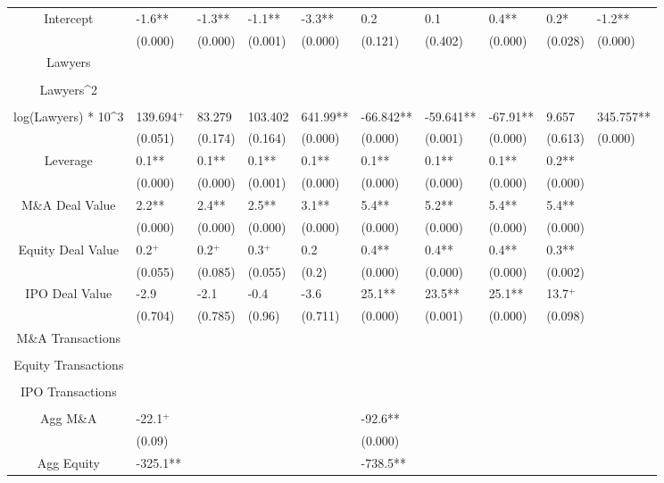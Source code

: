 \documentclass{article}
\begin{document}
\begin{table}[H]
\begin{tabular}{|clllllllll|}
Intercept & -1.6** & -1.3** & -1.1** & -3.3** & 0.2 & 0.1 & 0.4** & 0.2* & -1.2** \\
   & (0.000) & (0.000) & (0.001) & (0.000) & (0.121) & (0.402) & (0.000) & (0.028) & (0.000) \\
  Lawyers &  &  &  &  &  &  &  &  &  \\
   &  &  &  &  &  &  &  &  &  \\
  Lawyers^2 &  &  &  &  &  &  &  &  &  \\
   &  &  &  &  &  &  &  &  &  \\
  log(Lawyers) * 10^3 & 139.694$^{+}$ & 83.279 & 103.402 & 641.99** & -66.842** & -59.641** & -67.91** & 9.657 & 345.757** \\
   & (0.051) & (0.174) & (0.164) & (0.000) & (0.000) & (0.001) & (0.000) & (0.613) & (0.000) \\
  Leverage & 0.1** & 0.1** & 0.1** & 0.1** & 0.1** & 0.1** & 0.1** & 0.2** &  \\
   & (0.000) & (0.000) & (0.001) & (0.000) & (0.000) & (0.000) & (0.000) & (0.000) &  \\
  M\&A Deal Value & 2.2** & 2.4** & 2.5** & 3.1** & 5.4** & 5.2** & 5.4** & 5.4** &  \\
   & (0.000) & (0.000) & (0.000) & (0.000) & (0.000) & (0.000) & (0.000) & (0.000) &  \\
  Equity Deal Value & 0.2$^{+}$ & 0.2$^{+}$ & 0.3$^{+}$ & 0.2 & 0.4** & 0.4** & 0.4** & 0.3** &  \\
   & (0.055) & (0.085) & (0.055) & (0.2) & (0.000) & (0.000) & (0.000) & (0.002) &  \\
  IPO Deal Value & -2.9 & -2.1 & -0.4 & -3.6 & 25.1** & 23.5** & 25.1** & 13.7$^{+}$ &  \\
   & (0.704) & (0.785) & (0.96) & (0.711) & (0.000) & (0.001) & (0.000) & (0.098) &  \\
  M\&A Transactions &  &  &  &  &  &  &  &  &  \\
   &  &  &  &  &  &  &  &  &  \\
  Equity Transactions &  &  &  &  &  &  &  &  &  \\
   &  &  &  &  &  &  &  &  &  \\
  IPO Transactions &  &  &  &  &  &  &  &  &  \\
   &  &  &  &  &  &  &  &  &  \\
  Agg M\&A & -22.1$^{+}$ &  &  &  & -92.6** &  &  &  &  \\
   & (0.09) &  &  &  & (0.000) &  &  &  &  \\
  Agg Equity & -325.1** &  &  &  & -738.5** &  &  &  &  \\

\end{tabular}
\end{table}
\end{document}
